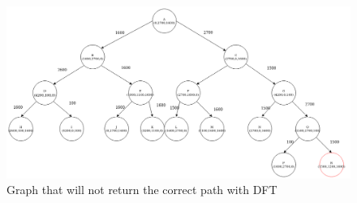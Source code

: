 \documentclass[12pt]{article}
\begin{document}
\begin{enumerate}
\begin{enumerate}
\begin{figure}[h!]
	\caption{Graph that will not return the correct path with DFT}
	\centering
	\includegraphics[scale=0.6, angle=90]{p4-1.png}
\end{figure}
	
	\end{enumerate}


\end{enumerate}
\end{document}
